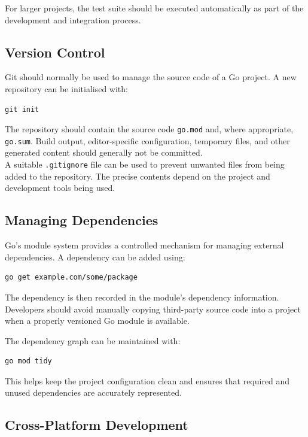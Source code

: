 For larger projects, the test suite should be executed automatically as part of the development and integration process.

\subsection{Version Control}

Git should normally be used to manage the source code of a Go project. A new repository can be initialised with:

\begin{lstlisting}
git init
\end{lstlisting}

The repository should contain the source code \texttt{go.mod} and, where appropriate, \texttt{go.sum}. Build output, editor-specific configuration, temporary files, and other generated content should generally not be committed.\\

A suitable \texttt{.gitignore} file can be used to prevent unwanted files from being added to the repository. The precise contents depend on the project and development tools being used.

\subsection{Managing Dependencies}

Go's module system provides a controlled mechanism for managing external dependencies. A dependency can be added using:

\begin{lstlisting}
go get example.com/some/package
\end{lstlisting}

The dependency is then recorded in the module's dependency information. Developers should avoid manually copying third-party source code into a project when a properly versioned Go module is available.

The dependency graph can be maintained with:

\begin{lstlisting}
go mod tidy
\end{lstlisting}

This helps keep the project configuration clean and ensures that required and unused dependencies are accurately represented.

\subsection{Cross-Platform Development}

